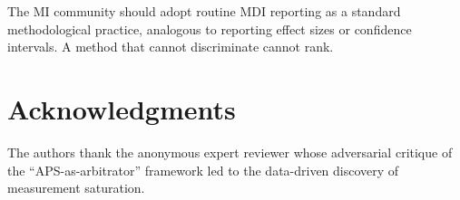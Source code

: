 \documentclass[pdflatex,sn-mathphys-num]{sn-jnl}
\begin{document}
The MI community should adopt routine MDI reporting as a standard methodological practice, analogous to reporting effect sizes or confidence intervals. A method that cannot discriminate cannot rank.

\section*{Acknowledgments}

The authors thank the anonymous expert reviewer whose adversarial critique of the ``APS-as-arbitrator'' framework led to the data-driven discovery of measurement saturation.

\end{document}
